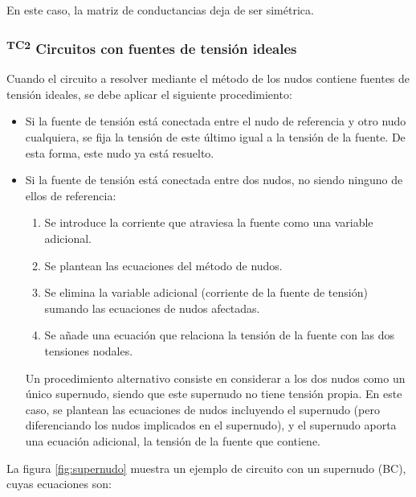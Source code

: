         En este caso, la matriz de conductancias deja de ser
        simétrica.

        \subsubsection{\textsuperscript{TC2} Circuitos con fuentes de
          tensión ideales}
        \label{sec:nudos-fuentes-ideales}

        Cuando el circuito a resolver mediante el método de los nudos
        contiene fuentes de tensión ideales, se debe aplicar el
        siguiente procedimiento:

        \begin{itemize}
        \item Si la fuente de tensión está conectada entre el nudo de
          referencia y otro nudo cualquiera, se fija la tensión de
          este último igual a la tensión de la fuente. De esta forma,
          este nudo ya está resuelto.
        \item Si la fuente de tensión está conectada entre dos nudos,
          no siendo ninguno de ellos de referencia:
          \begin{enumerate}
          \item Se introduce la corriente que atraviesa la fuente como
            una variable adicional.
          \item Se plantean las ecuaciones del método de nudos.
          \item Se elimina la variable adicional (corriente de la
            fuente de tensión) sumando las ecuaciones de nudos
            afectadas.
          \item Se añade una ecuación que relaciona la tensión de la
            fuente con las dos tensiones nodales.
          \end{enumerate}
          Un procedimiento alternativo consiste en considerar a los
          dos nudos como un único supernudo, siendo que este supernudo
          no tiene tensión propia. En este caso, se plantean las
          ecuaciones de nudos incluyendo el supernudo (pero
          diferenciando los nudos implicados en el supernudo), y el
          supernudo aporta una ecuación adicional, la tensión de la
          fuente que contiene.
        \end{itemize}

        La figura \ref{fig:supernudo} muestra un ejemplo de circuito
        con un supernudo (BC), cuyas ecuaciones son:


